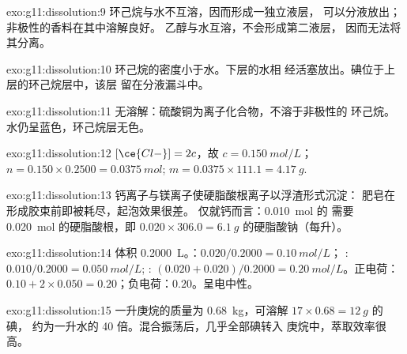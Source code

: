 \begin{solution}{exo:g11:dissolution:9}
环己烷与水不互溶，因而形成一独立液层，
可以分液放出；非极性的香料在其中溶解良好。
乙醇与水互溶，不会形成第二液层，
因而无法将其分离。
\end{solution}

\begin{solution}{exo:g11:dissolution:10}
环己烷的密度小于水。下层的水相
经活塞放出。碘位于上层的环己烷层中，该层
留在分液漏斗中。
\end{solution}

\begin{solution}{exo:g11:dissolution:11}
无溶解：硫酸铜为离子化合物，不溶于非极性的
环己烷。水仍呈蓝色，环己烷层无色。
\end{solution}

\begin{solution}{exo:g11:dissolution:12}
$[\ce{Cl-}] = 2c$，故 $c = \qty{0.150}{mol/L}$；
$n = 0.150 \times 0.2500 = \qty{0.0375}{mol}$;
$m = 0.0375 \times 111.1 = \qty{4.17}{g}$.
\end{solution}

\begin{solution}{exo:g11:dissolution:13}
钙离子与镁离子使硬脂酸根离子以浮渣形式沉淀：
肥皂在形成胶束前即被耗尽，起泡效果很差。
仅就钙而言：\qty{0.010}{mol} 的  需要
\qty{0.020}{mol} 的硬脂酸根，即 $0.020 \times 306.0 =
\qty{6.1}{g}$ 的硬脂酸钠（每升）。
\end{solution}

\begin{solution}{exo:g11:dissolution:14}
体积 \qty{0.2000}{L}。：$0.020 / 0.2000 = \qty{0.10}{mol/L}$；
: $0.010 / 0.2000 = \qty{0.050}{mol/L}$; :
$(0.020 + 0.020) / 0.2000 = \qty{0.20}{mol/L}$。正电荷：
$0.10 + 2 \times 0.050 = 0.20$；负电荷：$0.20$。呈电中性。
\end{solution}

\begin{solution}{exo:g11:dissolution:15}
一升庚烷的质量为 \qty{0.68}{kg}，可溶解
$17 \times 0.68 = \qty{12}{g}$ 的碘，
约为一升水的 40 倍。混合振荡后，几乎全部碘转入
庚烷中，萃取效率很高。
\end{solution}

